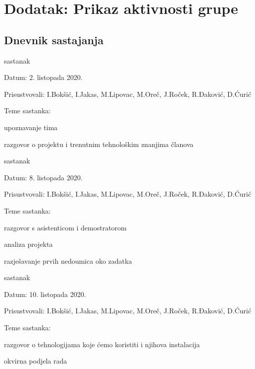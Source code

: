 \chapter*{Dodatak: Prikaz aktivnosti grupe}
		
		\section*{Dnevnik sastajanja}
		
		
		\begin{packed_enum}
			\item  sastanak
			
			\item[] \begin{packed_item}
				\item Datum: 2. listopada 2020.
				\item Prisustvovali: I.Bokšić, I.Jakas, M.Lipovac, M.Oreč, J.Roček, R.Đaković, D.Ćurić
				\item Teme sastanka:
				\begin{packed_item}
					\item  upoznavanje tima
					\item  razgovor o projektu i trenutnim tehnološkim znanjima članova
				\end{packed_item}
			\end{packed_item}
			
				\item  sastanak
			\item[] \begin{packed_item}
				\item Datum: 8. listopada 2020.
				\item Prisustvovali: I.Bokšić, I.Jakas, M.Lipovac, M.Oreč, J.Roček, R.Đaković, D.Ćurić
				\item Teme sastanka:
				\begin{packed_item}
					\item  razgovor s asistenticom i demostratorom
					\item analiza projekta
					\item razješavanje prvih nedoumica oko zadatka 
				\end{packed_item}
			\end{packed_item}
		
			\item  sastanak
			\item[] \begin{packed_item}
				\item Datum: 10. listopada 2020.
				\item Prisustvovali: I.Bokšić, I.Jakas, M.Lipovac, M.Oreč, J.Roček, R.Đaković, D.Ćurić
				\item Teme sastanka:
				\begin{packed_item}
					\item  razgovor o tehnologijama koje ćemo koristiti i njihova instalacija
					\item  okvirna podjela rada
				\end{packed_item}
			\end{packed_item}
			

\end{packed_enum}
